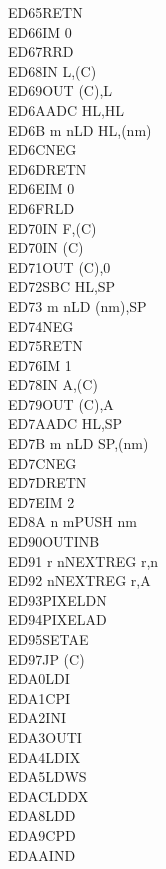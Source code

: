 \documentclass[12pt,twoside,openright,a4paper]{book}
\begin{document}
\begin{multicols}{3}
{\begin{tabbing}
	ED65\>RETN\UNDOC\\
	ED66\>IM 0\UNDOC\\
	ED67\>RRD\\
	ED68\>IN L,(C)\\
	ED69\>OUT (C),L\\
	ED6A\>ADC HL,HL\\
	ED6B m n\>LD HL,(nm)\\
	ED6C\>NEG\UNDOC\\
	ED6D\>RETN\UNDOC\\
	ED6E\>IM 0\UNDOC\\
	ED6F\>RLD\\
	ED70\>IN F,(C)\UNDOC\\
	ED70\>IN (C)\UNDOC\\
	ED71\>OUT (C),0\UNDOC\\
	ED72\>SBC HL,SP\\
	ED73 m n\>LD (nm),SP\\
	ED74\>NEG\UNDOC\\
	ED75\>RETN\UNDOC\\
	ED76\>IM 1\UNDOC\\
	ED78\>IN A,(C)\\
	ED79\>OUT (C),A\\
	ED7A\>ADC HL,SP\\
	ED7B m n\>LD SP,(nm)\\
	ED7C\>NEG\UNDOC\\
	ED7D\>RETN\UNDOC\\
	ED7E\>IM 2\UNDOC\\
	ED8A n m\>PUSH nm\ZXN\\
	ED90\>OUTINB\ZXN\\
	ED91 r n\>NEXTREG r,n\ZXN\\
	ED92 n\>NEXTREG r,A\ZXN\\
	ED93\>PIXELDN\ZXN\\
	ED94\>PIXELAD\ZXN\\
	ED95\>SETAE\ZXN\\
	ED97\>JP (C)\ZXN\\
	EDA0\>LDI\\
	EDA1\>CPI\\
	EDA2\>INI\\
	EDA3\>OUTI\\
	EDA4\>LDIX\ZXN\\
	EDA5\>LDWS\ZXN\\
	EDAC\>LDDX\ZXN\\
	EDA8\>LDD\\
	EDA9\>CPD\\
	EDAA\>IND\\

\end{tabbing}}
\end{multicols}
\end{document}
